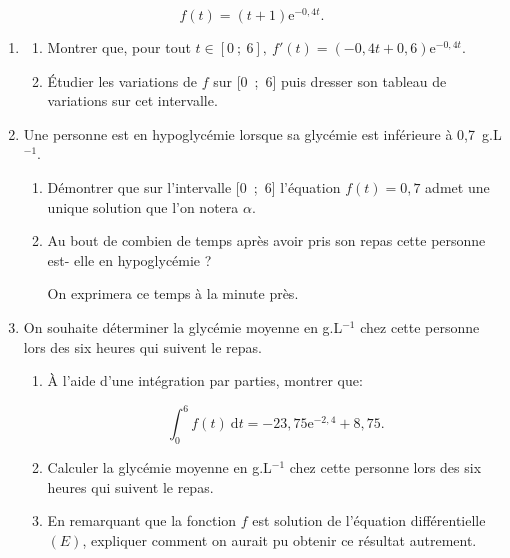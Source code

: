 \documentclass[10pt]{article}
\providecommand{\e}{{\mathrm{e}}}
\begin{document}
\[f(t) = (t + 1)\e^{-0,4t}.\]

\medskip

\begin{enumerate}
\item
	\begin{enumerate}
		\item Montrer que, pour tout $t \in [0~;~6],\: f'(t) = (- 0,4t + 0,6)\e^{-0,4t}$.
		\item Étudier les variations de $f$ sur [0~;~6] puis dresser son tableau de variations sur cet intervalle.
	\end{enumerate}
\item Une personne est en hypoglycémie lorsque sa glycémie est inférieure à 0,7~g.L$^{-1}$.
	\begin{enumerate}
		\item Démontrer que sur l'intervalle [0~;~6] l'équation $f(t) = 0,7$ admet une unique
solution que l'on notera $\alpha$.
		\item Au bout de combien de temps après avoir pris son repas cette personne est-
elle en hypoglycémie ?

On exprimera ce temps à la minute près.
	\end{enumerate}
\item On souhaite déterminer la glycémie moyenne en g.L$^{-1}$ chez cette personne lors des six heures qui suivent le repas.
	\begin{enumerate}
		\item À l'aide d'une intégration par parties, montrer que:

\[\displaystyle\int_0^6 f(t)\: \text{d}t = - 23,75\e^{-2,4} + 8,75.\]

		\item Calculer la glycémie moyenne en g.L$^{-1}$ chez cette personne lors des six heures qui suivent le repas.
		\item En remarquant que la fonction $f$ est solution de l'équation différentielle $(E)$, expliquer comment on aurait pu obtenir ce résultat autrement.
	\end{enumerate}
\end{enumerate}

\bigskip
\end{document}
